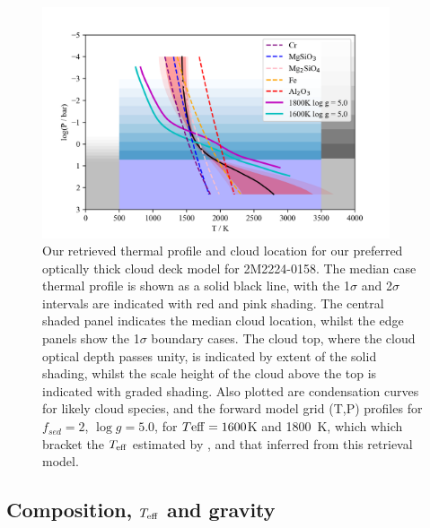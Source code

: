 \documentclass[useAMS,usenatbib]{mn2e}
\begin{document}
\begin{figure}
\hspace{-0.8cm}\includegraphics[width=290pt]{2M2224_profile_2sigma_ucl.png}
\caption{Our retrieved thermal profile and cloud location for our preferred optically thick cloud deck model for 2M2224-0158. The median case thermal profile is shown as a solid black line, with the 1$\sigma$  and 2$\sigma$ intervals are indicated with red and pink shading. The central shaded panel indicates the median cloud location, whilst the edge panels show the 1$\sigma$ boundary cases. The cloud top, where the cloud optical depth passes unity, is indicated by extent of the solid shading, whilst the scale height of the cloud above the top is indicated with graded shading. Also plotted are condensation curves for likely cloud species, and the forward model grid (T,P) profiles for $f_{sed} = 2$, $\log g = 5.0$,  for $T{\rm eff} =  1600$K and 1800~K, which which bracket the $T_{\rm eff}$ estimated by \citet{filippazzo2015}, and that inferred from this retrieval model.
\label{fig:2m2224thickprof}}
\end{figure}


\subsection{Composition, $T_{\rm eff}$ and gravity}
\label{subsec:comp}
\end{document}
